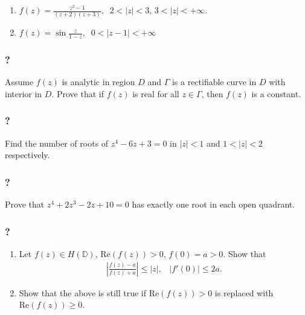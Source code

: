 \begin{enumerate}
\def\labelenumi{(\alph{enumi})}
\item
  \(\displaystyle f(z) = \frac{z^2 - 1}{ (z+2)(z+3)}, \; \; 2 < |z| < 3\),
  \(3 < |z| < + \infty\).
\item
  \(\displaystyle f(z) = \sin \frac{z}{1-z}, \; \; 0 < |z-1| < + \infty\)
\end{enumerate}

\hypertarget{section-150}{%
\subsubsection{?}\label{section-150}}

Assume \(f(z)\) is analytic in region \(D\) and \(\Gamma\) is a
rectifiable curve in \(D\) with interior in \(D\). Prove that if
\(f(z)\) is real for all \(z \in \Gamma\), then \(f(z)\) is a constant.

\hypertarget{section-151}{%
\subsubsection{?}\label{section-151}}

Find the number of roots of \(z^4 - 6z + 3 =0\) in \(|z|<1\) and
\(1 < |z| < 2\) respectively.

\hypertarget{section-152}{%
\subsubsection{?}\label{section-152}}

Prove that \(z^4 + 2 z^3 - 2z + 10 =0\) has exactly one root in each
open quadrant.

\hypertarget{section-153}{%
\subsubsection{?}\label{section-153}}

\begin{enumerate}
\def\labelenumi{(\arabic{enumi})}
\item
  Let \(f(z) \in H({\mathbb D})\), \(\text{Re}(f(z)) >0\),
  \(f(0)= a>0\). Show that
  \begin{align*}|\frac{f(z)-a}{f(z)+a}| \leq |z|, \; \; \;
  |f'(0)| \leq 2a.\end{align*}
\item
  Show that the above is still true if \(\text{Re}(f(z)) >0\) is
  replaced with \(\text{Re}(f(z)) \geq 0\).
\end{enumerate}

